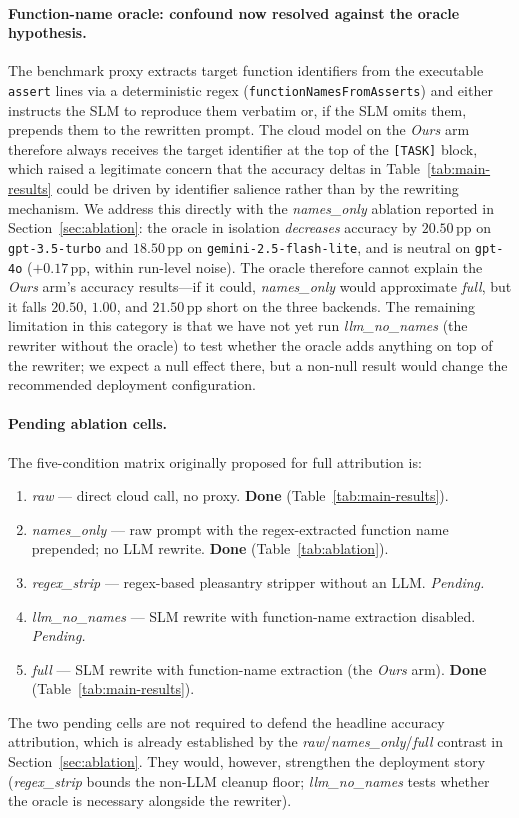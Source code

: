 \documentclass[11pt,a4paper,twocolumn]{article}
\begin{document}
\paragraph{Function-name oracle: confound now resolved against the oracle hypothesis.} The benchmark proxy extracts target function identifiers from the executable \texttt{assert} lines via a deterministic regex (\texttt{functionNamesFromAsserts}) and either instructs the SLM to reproduce them verbatim or, if the SLM omits them, prepends them to the rewritten prompt. The cloud model on the \textit{Ours} arm therefore always receives the target identifier at the top of the \texttt{[TASK]} block, which raised a legitimate concern that the accuracy deltas in Table~\ref{tab:main-results} could be driven by identifier salience rather than by the rewriting mechanism. We address this directly with the \textit{names\_only} ablation reported in Section~\ref{sec:ablation}: the oracle in isolation \emph{decreases} accuracy by $20.50$\,pp on \texttt{gpt-3.5-turbo} and $18.50$\,pp on \texttt{gemini-2.5-flash-lite}, and is neutral on \texttt{gpt-4o} ($+0.17$\,pp, within run-level noise). The oracle therefore cannot explain the \textit{Ours} arm's accuracy results---if it could, \textit{names\_only} would approximate \textit{full}, but it falls $20.50$, $1.00$, and $21.50$\,pp short on the three backends. The remaining limitation in this category is that we have not yet run \textit{llm\_no\_names} (the rewriter without the oracle) to test whether the oracle adds anything on top of the rewriter; we expect a null effect there, but a non-null result would change the recommended deployment configuration.

\paragraph{Pending ablation cells.} The five-condition matrix originally proposed for full attribution is:
\begin{enumerate}
    \item \textit{raw} --- direct cloud call, no proxy. \textbf{Done} (Table~\ref{tab:main-results}).
    \item \textit{names\_only} --- raw prompt with the regex-extracted function name prepended; no LLM rewrite. \textbf{Done} (Table~\ref{tab:ablation}).
    \item \textit{regex\_strip} --- regex-based pleasantry stripper without an LLM. \textit{Pending.}
    \item \textit{llm\_no\_names} --- SLM rewrite with function-name extraction disabled. \textit{Pending.}
    \item \textit{full} --- SLM rewrite with function-name extraction (the \textit{Ours} arm). \textbf{Done} (Table~\ref{tab:main-results}).
\end{enumerate}
The two pending cells are not required to defend the headline accuracy attribution, which is already established by the \textit{raw}/\textit{names\_only}/\textit{full} contrast in Section~\ref{sec:ablation}. They would, however, strengthen the deployment story (\textit{regex\_strip} bounds the non-LLM cleanup floor; \textit{llm\_no\_names} tests whether the oracle is necessary alongside the rewriter).
\end{document}
